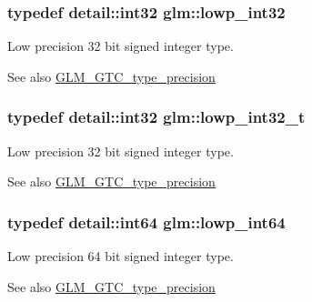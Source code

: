 \subsubsection[{lowp\+\_\+int32}]{\setlength{\rightskip}{0pt plus 5cm}typedef {\bf detail\+::int32} {\bf glm\+::lowp\+\_\+int32}}\label{group__gtc__type__precision_gad9939c9d6fec1c6accc02a83c6500f08}
Low precision 32 bit signed integer type. \begin{DoxySeeAlso}{See also}
\hyperlink{group__gtc__type__precision}{G\+L\+M\+\_\+\+G\+T\+C\+\_\+type\+\_\+precision} 
\end{DoxySeeAlso}
\hypertarget{group__gtc__type__precision_gad9567c806dc39f534174eef42663119d}{}
\subsubsection[{lowp\+\_\+int32\+\_\+t}]{\setlength{\rightskip}{0pt plus 5cm}typedef {\bf detail\+::int32} {\bf glm\+::lowp\+\_\+int32\+\_\+t}}\label{group__gtc__type__precision_gad9567c806dc39f534174eef42663119d}
Low precision 32 bit signed integer type. \begin{DoxySeeAlso}{See also}
\hyperlink{group__gtc__type__precision}{G\+L\+M\+\_\+\+G\+T\+C\+\_\+type\+\_\+precision} 
\end{DoxySeeAlso}
\hypertarget{group__gtc__type__precision_gab8a8e75af347592406e41b3ae2c0712b}{}
\subsubsection[{lowp\+\_\+int64}]{\setlength{\rightskip}{0pt plus 5cm}typedef detail\+::int64 {\bf glm\+::lowp\+\_\+int64}}\label{group__gtc__type__precision_gab8a8e75af347592406e41b3ae2c0712b}
Low precision 64 bit signed integer type. \begin{DoxySeeAlso}{See also}
\hyperlink{group__gtc__type__precision}{G\+L\+M\+\_\+\+G\+T\+C\+\_\+type\+\_\+precision} 
\end{DoxySeeAlso}
\hypertarget{group__gtc__type__precision_ga14d72e76d57c7f28eca8e933816c9fd6}{}
